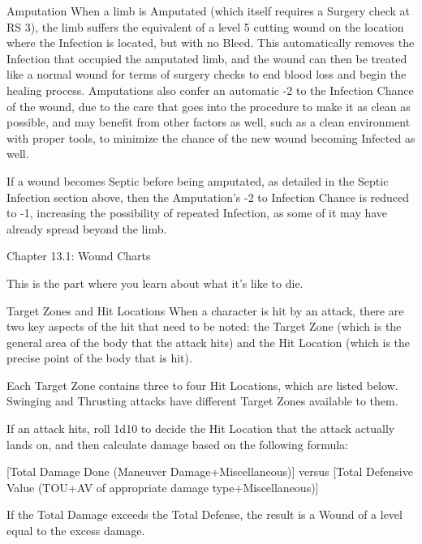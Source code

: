 \documentclass[oneside,11pt,english]{book}
\begin{document}
 


Amputation 
When a limb is Amputated (which itself requires a Surgery check at RS 3), the limb suffers the equivalent 
of a level 5 cutting wound on the location where the Infection is located, but with no Bleed. This 
automatically removes the Infection that occupied the amputated limb, and the wound can then be treated 
like a normal wound for terms of surgery checks to end blood loss and begin the healing process. 
Amputations also confer an automatic -2 to the Infection Chance of the wound, due to the care that goes 
into the procedure to make it as clean as possible, and may benefit from other factors as well, such as a 
clean environment with proper tools, to minimize the chance of the new wound becoming Infected as 
well. 

 

If a wound becomes Septic before being amputated, as detailed in the Septic Infection section above, then 
the Amputation’s -2 to Infection Chance is reduced to -1, increasing the possibility of repeated Infection, 
as some of it may have already spread beyond the limb. 
 
Chapter 13.1: Wound Charts 

 

 

This is the part where you learn about what it’s like to die. 

 

 

Target Zones and Hit Locations 
When a character is hit by an attack, there are two key aspects of the hit that need to be noted: the Target 
Zone (which is the general area of the body that the attack hits) and the Hit Location (which is the precise 
point of the body that is hit). 

 

Each Target Zone contains three to four Hit Locations, which are listed below. Swinging and Thrusting 
attacks have different Target Zones available to them. 

 

If an attack hits, roll 1d10 to decide the Hit Location that the attack actually lands on, and then calculate 
damage based on the following formula: 

 

[Total Damage Done (Maneuver Damage+Miscellaneous)] versus [Total Defensive Value (TOU+AV of 
appropriate damage type+Miscellaneous)] 

 

If the Total Damage exceeds the Total Defense, the result is a Wound of a level equal to the excess 
damage. 
\end{document}
